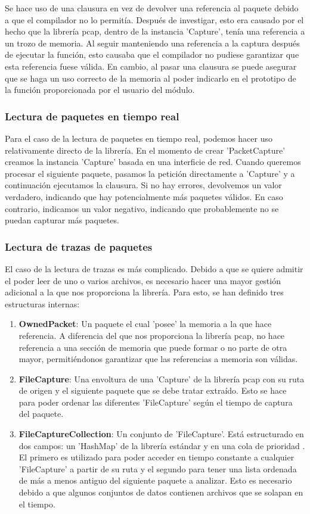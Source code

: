 Se hace uso de una clausura en vez de devolver una referencia al paquete debido a que el compilador no lo permitía. Después de investigar, esto era causado por el hecho que la librería pcap, dentro de la instancia 'Capture', tenía una referencia a un trozo de memoria. Al seguir manteniendo una referencia a la captura después de ejecutar la función, esto causaba que el compilador no pudiese garantizar que esta referencia fuese válida. En cambio, al pasar una clausura se puede asegurar que se haga un uso correcto de la memoria al poder indicarlo en el prototipo de la función proporcionada por el usuario del módulo.

\subsubsection{Lectura de paquetes en tiempo real}

Para el caso de la lectura de paquetes en tiempo real, podemos hacer uso relativamente directo de la librería. En el momento de crear 'PacketCapture' creamos la instancia 'Capture' basada en una interficie de red. Cuando queremos procesar el siguiente paquete, pasamos la petición directamente a 'Capture' y a continuación ejecutamos la clausura. Si no hay errores, devolvemos un valor verdadero, indicando que hay potencialmente más paquetes válidos. En caso contrario, indicamos un valor negativo, indicando que probablemente no se puedan capturar más paquetes.

\subsubsection{Lectura de trazas de paquetes}

El caso de la lectura de trazas es más complicado. Debido a que se quiere admitir el poder leer de uno o varios archivos, es necesario hacer una mayor gestión adicional a la que nos proporciona la librería. Para esto, se han definido tres estructuras internas:
\begin{enumerate}
  \item \textbf{OwnedPacket}: Un paquete el cual 'posee' la memoria a la que hace referencia. A diferencia del que nos proporciona la librería pcap, no hace referencia a una sección de memoria que puede formar o no parte de otra mayor, permitiéndonos garantizar que las referencias a memoria son válidas.
  \item \textbf{FileCapture}: Una envoltura de una 'Capture' de la librería pcap con su ruta de origen y el siguiente paquete que se debe tratar extraído. Esto se hace para poder ordenar las diferentes 'FileCapture' según el tiempo de captura del paquete.
  \item \textbf{FileCaptureCollection}: Un conjunto de 'FileCapture'. Está estructurado en dos campos: un 'HashMap' de la librería estándar y en una cola de prioridad \cite{priority-queue}. El primero es utilizado para poder acceder en tiempo constante a cualquier 'FileCapture' a partir de su ruta y el segundo para tener una lista ordenada de más a menos antiguo del siguiente paquete a analizar. Esto es necesario debido a que algunos conjuntos de datos contienen archivos que se solapan en el tiempo.
\end{enumerate}

